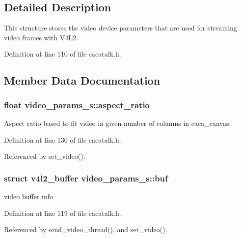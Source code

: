 \subsection{\-Detailed \-Description}
\-This structure stores the video device parameters that are used for streaming video frames with \-V4\-L2. 

\-Definition at line 110 of file cacatalk.\-h.



\subsection{\-Member \-Data \-Documentation}
\hypertarget{structvideo__params__s_a1b7019b0aa1838ed55f41cd299cd7fb3}{
\subsubsection[{aspect\-\_\-ratio}]{\setlength{\rightskip}{0pt plus 5cm}float {\bf video\-\_\-params\-\_\-s\-::aspect\-\_\-ratio}}}\label{structvideo__params__s_a1b7019b0aa1838ed55f41cd299cd7fb3}


\-Aspect ratio based to fit video in given number of columns in caca\-\_\-canvas. 



\-Definition at line 130 of file cacatalk.\-h.



\-Referenced by set\-\_\-video().

\hypertarget{structvideo__params__s_ac6db9e27abcbbf76acd19e7eb0b946b2}{
\subsubsection[{buf}]{\setlength{\rightskip}{0pt plus 5cm}struct v4l2\-\_\-buffer {\bf video\-\_\-params\-\_\-s\-::buf}}}\label{structvideo__params__s_ac6db9e27abcbbf76acd19e7eb0b946b2}


video buffer info 



\-Definition at line 119 of file cacatalk.\-h.



\-Referenced by send\-\_\-video\-\_\-thread(), and set\-\_\-video().

